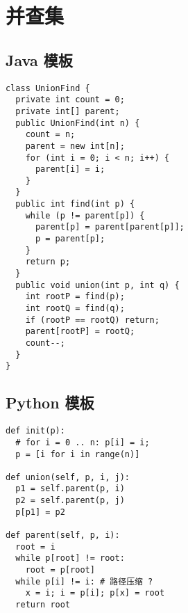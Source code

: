 \newpage
\section{并查集}

\subsection{Java 模板}

\begin{verbatim}
class UnionFind {
  private int count = 0;
  private int[] parent;
  public UnionFind(int n) {
    count = n;
    parent = new int[n];
    for (int i = 0; i < n; i++) {
      parent[i] = i;
    }
  }
  public int find(int p) {
    while (p != parent[p]) {
      parent[p] = parent[parent[p]];
      p = parent[p];
    }
    return p;
  }
  public void union(int p, int q) {
    int rootP = find(p);
    int rootQ = find(q);
    if (rootP == rootQ) return;
    parent[rootP] = rootQ;
    count--;
  }
}
\end{verbatim}

\subsection{Python 模板}

\begin{verbatim}
def init(p):
  # for i = 0 .. n: p[i] = i;
  p = [i for i in range(n)]

def union(self, p, i, j):
  p1 = self.parent(p, i)
  p2 = self.parent(p, j)
  p[p1] = p2

def parent(self, p, i):
  root = i
  while p[root] != root:
    root = p[root]
  while p[i] != i: # 路径压缩 ?
    x = i; i = p[i]; p[x] = root
  return root
\end{verbatim}

